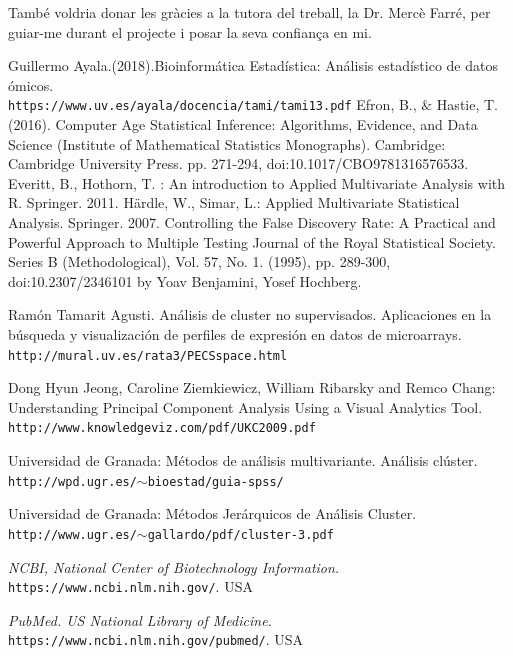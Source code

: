 \documentclass[english]{article}
\begin{document}
També voldria donar les gràcies a la tutora del treball, la Dr. Mercè Farré, per guiar-me durant el projecte i posar la seva confian\c{c}a en mi.
\clearpage
\begin{thebibliography}{aaaa}
Guillermo Ayala.(2018).Bioinformática Estadística: Análisis estadístico de datos ómicos. \pageref{1.1}
\\\texttt{https://www.uv.es/ayala/docencia/tami/tami13.pdf}
Efron, B., $\&$ Hastie, T. (2016). Computer Age Statistical Inference: Algorithms, Evidence, and Data Science (Institute of Mathematical Statistics Monographs). Cambridge: Cambridge University Press. pp. 271-294, doi:10.1017/CBO9781316576533. \pageref{2.2}
Everitt, B., Hothorn, T. : An introduction to Applied Multivariate Analysis with R. Springer. 2011. \pageref{2.4}
Härdle, W., Simar, L.: Applied Multivariate Statistical Analysis. Springer. 2007. \pageref{2.4}
Controlling the False Discovery Rate: A Practical and Powerful Approach to Multiple Testing Journal of the Royal Statistical Society. Series B (Methodological), Vol. 57, No. 1. (1995), pp. 289-300, doi:10.2307/2346101 by Yoav Benjamini, Yosef Hochberg. \pageref{2.2.1}

Ramón Tamarit Agusti. Análisis de cluster no supervisados. Aplicaciones en
la búsqueda y visualización de perfiles de expresión
en datos de microarrays. \pageref{2.4.1}
\\\texttt{http://mural.uv.es/rata3/PECSspace.html}

Dong Hyun Jeong, Caroline Ziemkiewicz, William Ribarsky and Remco Chang: Understanding Principal Component Analysis Using a Visual Analytics Tool. \pageref{2.4.3}
\\\texttt{http://www.knowledgeviz.com/pdf/UKC2009.pdf}

Universidad de Granada: Métodos de análisis multivariante. Análisis clúster. \pageref{2.4.1}
\\\texttt{http://wpd.ugr.es/$\sim$bioestad/guia-spss/}

Universidad de Granada: Métodos Jerárquicos de Análisis Cluster. \pageref{2.4.1}
\\\texttt{http://www.ugr.es/$\sim$gallardo/pdf/cluster-3.pdf}

\textit{NCBI, National Center of Biotechnology Information.}
\\\texttt{https://www.ncbi.nlm.nih.gov/}. USA

\textit{PubMed. US National Library of Medicine.}
\\\texttt{https://www.ncbi.nlm.nih.gov/pubmed/}. USA

\end{thebibliography}
\clearpage
\appendix
\onecolumn
\end{document}
